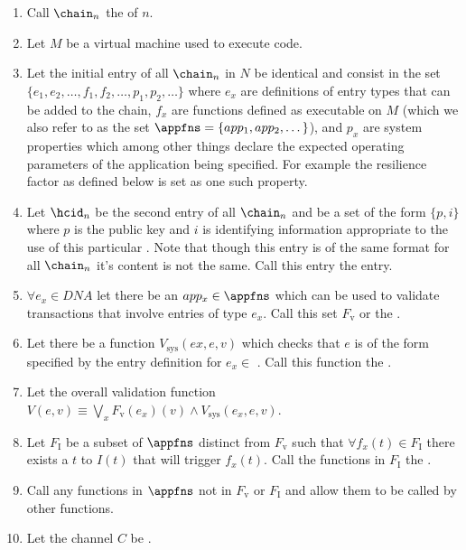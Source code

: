 \documentclass[twocolumn,showpacs,
  nofootinbib,aps,superscriptaddress,
  eqsecnum,prd,notitlepage,showkeys,10pt]{revtex4-1}
\begin{document}
\begin{enumerate}

\item Call $\chain_n$ the  of $n$.

\item Let $M$ be a virtual machine used to execute code.

\item Let the initial entry of all $\chain_n$ in $N$ be identical and consist in the set \hcdna $\{e_1,e_2,\dots,f_1,f_2,\dots,p_1,p_2,\dots\}$ where $e_x$ are definitions of entry types that can be added to the chain, $f_x$ are functions defined as executable on $M$ (which we also refer to as the set $\appfns = \{app_1,app_2,\dots\}$), and $p_x$ are  system properties which among other things declare the expected operating parameters of the application being specified.  For example the resilience factor as defined below is set as one such property.

\item Let $\hcid_n$ be the second entry of all $\chain_n$ and be a set of the form $\{p,i\}$ where $p$ is the public key and $i$ is identifying information appropriate to the use of this particular \shc. Note that though this entry is of the same format for all $\chain_n$ it's content is not the same. Call this entry the  entry.

\item $\forall e_x \in DNA$ let there be an $app_x \in \appfns$ which can be used to validate transactions that involve entries of type $e_x$.  Call this set $F_\mathrm{v}$ or the .

\item Let there be a function $V_\mathrm{sys}(ex,e,v)$ which checks that $e$ is of the form specified by the entry definition for $e_x \in$ \hcdna.  Call this function the .

\item Let the overall validation function $V(e,v) \equiv \bigvee_x  F_\mathrm{v}(e_x)(v) \wedge V_\mathrm{sys}(e_x,e,v)$.

\item Let $F_\mathrm{I}$ be a subset of $\appfns$ distinct from $F_\mathrm{v}$ such that $\forall f_x(t) \in F_\mathrm{I}$ there exists a $t$ to $I(t)$ that will trigger $f_x(t)$. Call the functions in $F_\mathrm{I}$ the .

\item Call any functions in $\appfns$ not in $F_\mathrm{v}$ or $F_\mathrm{I}$  and allow them to be called by other functions.
\item Let the channel $C$ be .


\end{enumerate}
\end{document}
